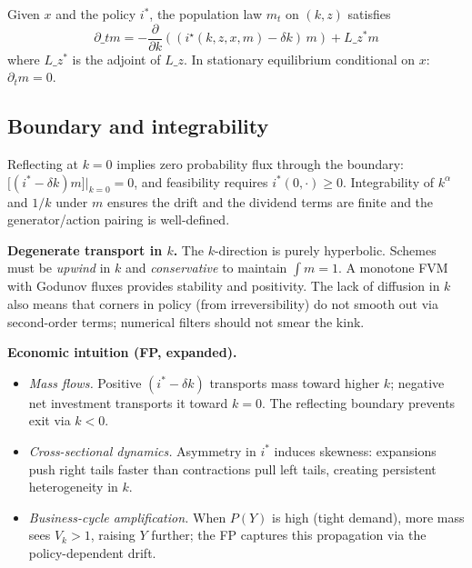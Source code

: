 \documentclass[11pt,letterpaper,oneside]{article}
\numberwithin{equation}{section}
\newcommand{\ac}[1]{{\mdseries\textsc{#1}}}
\newcommand{\1}{\mathbf{1}}
\newcommand{\Lz}{L\_z}
\newcommand{\Lzadj}{L\_z^{\!*}}
\begin{document}
Given $x$ and the policy $i^*$, the population law $m_t$ on $(k,z)$ satisfies
\begin{equation}
\partial\_t m = -\frac{\partial}{\partial k}\left((i^\star(k,z,x,m)-\delta k)\, m\right) + \Lzadj m
\tag{FP}\label{eq:FP}
\end{equation}
where $\Lzadj$ is the adjoint of $\Lz$. In stationary equilibrium conditional on $x$: $\partial_t m=0$.

\subsection{Boundary and integrability}
Reflecting at $k=0$ implies zero probability flux through the boundary:
$\big[(i^*-\delta k)m\big]\big|_{k=0}=0$,
and feasibility requires $i^*(0,\cdot)\ge 0$. Integrability of $k^\alpha$ and $1/k$ under $m$ ensures the drift and the dividend terms are finite and the generator/action pairing is well-defined.

\begin{tcolorbox}[mathstyle]
\textbf{Degenerate transport in $k$.} The $k$-direction is purely hyperbolic. Schemes must be \emph{upwind} in $k$ and \emph{conservative} to maintain $\int m=1$. A monotone \ac{FVM} with Godunov fluxes provides stability and positivity. The lack of diffusion in $k$ also means that corners in policy (from irreversibility) do not smooth out via second-order terms; numerical filters should not smear the kink.
\end{tcolorbox}

\begin{tcolorbox}[didacticstyle]
\textbf{Economic intuition (FP, expanded).}
\begin{itemize}[leftmargin=1.15em,itemsep=0.25em]
  \item \emph{Mass flows.} Positive $(i^*-\delta k)$ transports mass toward higher $k$; negative net investment transports it toward $k=0$. The reflecting boundary prevents exit via $k<0$.
  \item \emph{Cross-sectional dynamics.} Asymmetry in $i^*$ induces skewness: expansions push right tails faster than contractions pull left tails, creating persistent heterogeneity in $k$.
  \item \emph{Business-cycle amplification.} When $P(Y)$ is high (tight demand), more mass sees $V_k>1$, raising $Y$ further; the FP captures this propagation via the policy-dependent drift.
\end{itemize}
\end{tcolorbox}
\end{document}
